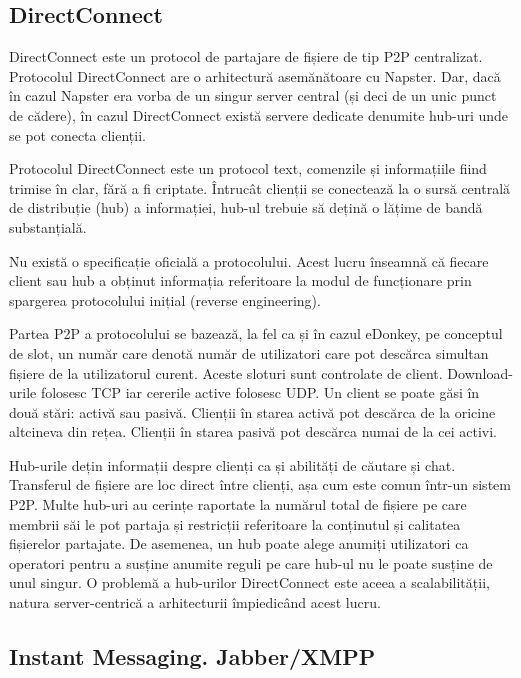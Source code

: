 \subsection{DirectConnect}

DirectConnect este un protocol de partajare de fișiere de tip P2P centralizat.
Protocolul DirectConnect are o arhitectură asemănătoare cu Napster. Dar, dacă
în cazul Napster era vorba de un singur server central (și deci de un unic
punct de cădere), în cazul DirectConnect există servere dedicate denumite
hub-uri unde se pot conecta clienții.

Protocolul DirectConnect este un protocol text, comenzile și informațiile
fiind trimise în clar, fără a fi criptate. Întrucât clienții se conectează la
o sursă centrală de distribuție (hub) a informației, hub-ul trebuie să dețină
o lățime de bandă substanțială.

Nu există o specificație oficială a protocolului. Acest lucru înseamnă că
fiecare client sau hub a obținut informația referitoare la modul de
funcționare prin spargerea protocolului inițial (reverse engineering).

Partea P2P a protocolului se bazează, la fel ca și în cazul eDonkey, pe
conceptul de slot, un număr care denotă număr de utilizatori care pot descărca
simultan fișiere de la utilizatorul curent. Aceste sloturi sunt controlate de
client. Download-urile folosesc TCP iar cererile active folosesc UDP. Un
client se poate găsi în două stări: activă sau pasivă. Clienții în starea
activă pot descărca de la oricine altcineva din rețea. Clienții în starea
pasivă pot descărca numai de la cei activi.

Hub-urile dețin informații despre clienți ca și abilități de căutare și chat.
Transferul de fișiere are loc direct între clienți, așa cum este comun într-un
sistem P2P. Multe hub-uri au cerințe raportate la numărul total de fișiere pe
care membrii săi le pot partaja și restricții referitoare la conținutul și
calitatea fișierelor partajate. De asemenea, un hub poate alege anumiți
utilizatori ca operatori pentru a susține anumite reguli pe care hub-ul nu le
poate susține de unul singur. O problemă a hub-urilor DirectConnect este aceea
a scalabilității, natura server-centrică a arhitecturii împiedicând acest
lucru.

\subsection{Instant Messaging. Jabber/XMPP}


